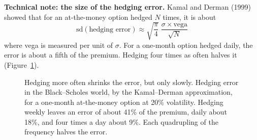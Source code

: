 \begin{technote}
\textbf{Technical note: the size of the hedging error.} Kamal and Derman (1999) showed that for an at-the-money option hedged $N$ times, it is about
\begin{equation}
  \mathrm{sd}(\text{hedging error}) \approx \sqrt{\frac{\pi}{4}}\;\frac{\sigma \times \text{vega}}{\sqrt{N}}
  \label{eq:14-kd}
\end{equation}
where vega is measured per unit of $\sigma$. For a one-month option hedged daily, the error is about a fifth of the premium. Hedging four times as often halves it (Figure~\ref{fig:14-freq}).
\end{technote}

\begin{figure}[htbp]
\centering
{}
\caption{Hedging more often shrinks the error, but only slowly. Hedging error in the Black--Scholes world, by the Kamal--Derman approximation, for a one-month at-the-money option at 20\% volatility. Hedging weekly leaves an error of about 41\% of the premium, daily about 18\%, and four times a day about 9\%. Each quadrupling of the frequency halves the error.}
\label{fig:14-freq}
\end{figure}

